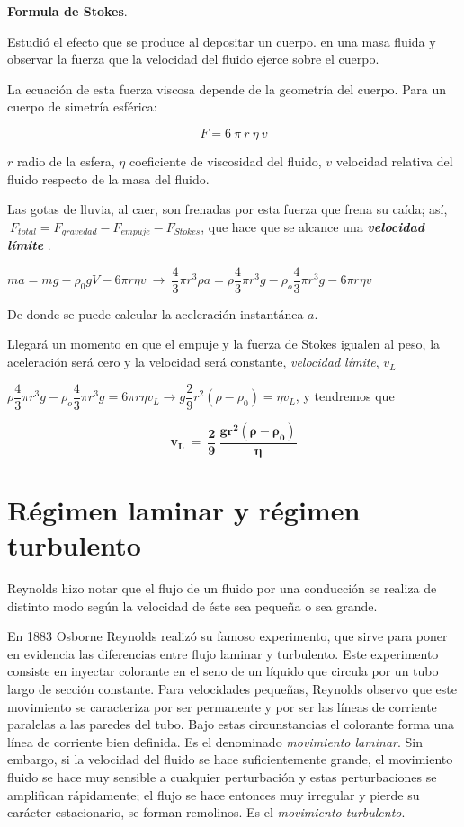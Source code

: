 \textbf{\large{Formula de Stokes}}\normalsize{.}

Estudió el efecto que se produce al depositar un cuerpo. en una masa fluida y observar la fuerza que la velocidad del fluido ejerce sobre el cuerpo. 

La ecuación de esta fuerza viscosa depende de la geometría del cuerpo. Para un cuerpo de simetría esférica:

$$F=6 \ \pi \ r \ \eta \ v$$

$r$ radio de la esfera, $\eta$ coeficiente de viscosidad del fluido, $v$ velocidad relativa del fluido respecto de la masa del fluido.

Las gotas de lluvia, al caer, son frenadas por esta fuerza que frena su caída; así, $\ F_{total}=F_{gravedad}-F_{empuje}-F_{Stokes}$, que hace que se alcance una \textbf{\emph{ velocidad límite }}.

$ma=mg-\rho_0gV-6\pi r\eta v \ \to \ \dfrac 4 3 \pi r^3 \rho a =\rho \dfrac 4 3 \pi r^3 g - \rho_o \dfrac 4 3 \pi r^3 g - 6 \pi r \eta v$

De donde se puede calcular la aceleración instantánea $a$.

Llegará un momento en que el empuje y la fuerza de Stokes igualen al peso, la aceleración será cero y la velocidad será constante, \emph{velocidad límite}, $v_L$

$\rho \dfrac 4 3 \pi r^3 g - \rho_o \dfrac 4 3 \pi r^3 g = 6 \pi r \eta v_L \to g 	\dfrac 2 9 r^2 (\rho - \rho_0)=\eta v_L$, y tendremos que

$$ \boldsymbol{v_L \ = \ \dfrac 2 9 \ \dfrac{g r^2 (\rho-\rho_0)}{\eta}} $$

\vspace{10mm} %
\section{Régimen laminar y régimen turbulento}

Reynolds hizo notar que el flujo de un fluido por una conducción se realiza de distinto modo según la velocidad de éste sea pequeña o sea grande.

En 1883 Osborne Reynolds realizó su famoso experimento, que sirve para poner en evidencia las diferencias entre flujo laminar y turbulento. Este experimento consiste en inyectar colorante en el seno de un líquido que circula por un tubo largo de sección constante. Para velocidades pequeñas, Reynolds observo que este movimiento se caracteriza por ser permanente y por ser las líneas de corriente paralelas a las paredes del tubo. Bajo estas circunstancias el colorante forma una línea de corriente bien definida. Es el denominado \emph{movimiento laminar}. Sin embargo, si la velocidad del fluido se hace suficientemente grande, el movimiento fluido se hace muy sensible a cualquier perturbación y estas perturbaciones se amplifican rápidamente; el flujo se hace entonces muy irregular y pierde su carácter estacionario, se forman remolinos. Es el \emph{movimiento turbulento}. 

